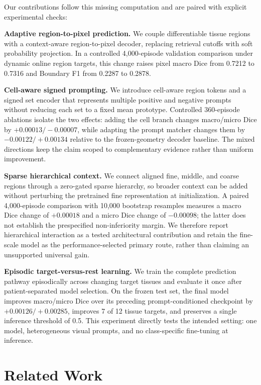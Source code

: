 \documentclass[letterpaper]{article} %
\begin{document}
Our contributions follow this missing computation and are paired with explicit experimental checks:

\noindent\textbf{Adaptive region-to-pixel prediction.}
We couple differentiable tissue regions with a context-aware region-to-pixel decoder, replacing retrieval cutoffs with soft probability projection. In a controlled 4,000-episode validation comparison under dynamic online region targets, this change raises pixel macro Dice from 0.7212 to 0.7316 and Boundary F1 from 0.2287 to 0.2878.

\noindent\textbf{Cell-aware signed prompting.}
We introduce cell-aware region tokens and a signed set encoder that represents multiple positive and negative prompts without reducing each set to a fixed mean prototype. Controlled 360-episode ablations isolate the two effects: adding the cell branch changes macro/micro Dice by $+0.00013/-0.00007$, while adapting the prompt matcher changes them by $-0.00122/+0.00134$ relative to the frozen-geometry decoder baseline. The mixed directions keep the claim scoped to complementary evidence rather than uniform improvement.

\noindent\textbf{Sparse hierarchical context.}
We connect aligned fine, middle, and coarse regions through a zero-gated sparse hierarchy, so broader context can be added without perturbing the pretrained fine representation at initialization. A paired 4,000-episode comparison with 10,000 bootstrap resamples measures a macro Dice change of $+0.00018$ and a micro Dice change of $-0.00098$; the latter does not establish the prespecified non-inferiority margin. We therefore report hierarchical interaction as a tested architectural contribution and retain the fine-scale model as the performance-selected primary route, rather than claiming an unsupported universal gain.

\noindent\textbf{Episodic target-versus-rest learning.}
We train the complete prediction pathway episodically across changing target tissues and evaluate it once after patient-separated model selection. On the frozen test set, the final model improves macro/micro Dice over its preceding prompt-conditioned checkpoint by $+0.00126/+0.00285$, improves 7 of 12 tissue targets, and preserves a single inference threshold of 0.5. This experiment directly tests the intended setting: one model, heterogeneous visual prompts, and no class-specific fine-tuning at inference.

\section{Related Work}
\end{document}
